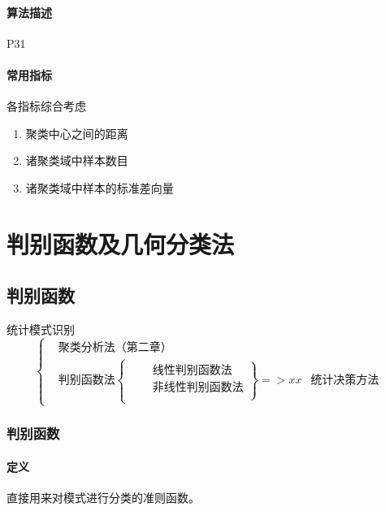 \documentclass[11pt]{article}
\begin{document}
\paragraph{算法描述}%
\label{par:suan_fa_miao_shu_}

P31

\paragraph{常用指标}%
\label{par:chang_yong_zhi_biao_}

各指标综合考虑

\begin{enumerate}
	\item 聚类中心之间的距离
	\item 诸聚类域中样本数目
	\item 诸聚类域中样本的标准差向量
\end{enumerate}

\section{判别函数及几何分类法}

\subsection{判别函数}

统计模式识别
$$
	\left\{
	\begin{aligned}
		& \mbox{聚类分析法（第二章）}\\
		& \mbox{判别函数法} 
		\left\{
		\begin{aligned}
			& \left.
			\begin{aligned}
				& \mbox{线性判别函数法} \\
				& \mbox{非线性判别函数法} \\
			\end{aligned}
			\right\} => xx
				& \mbox{统计决策方法}
		\end{aligned}
		\right.
	\end{aligned}
	\right.
$$
\subsubsection{判别函数}%
\label{ssub:pan_bie_han_shu_}

\paragraph{定义}%
\label{par:ding_yi_}

直接用来对模式进行分类的准则函数。
\end{document}
